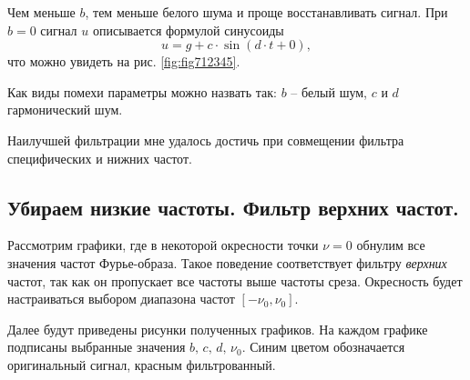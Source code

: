 \documentclass[a4paper, 12pt]{article}
\begin{document}
    Чем меньше $b$, тем меньше белого шума и проще восстанавливать сигнал.
    При $b=0$ сигнал $u$ описывается формулой синусоиды $$u=g+c\cdot\sin{(d\cdot t+0)},$$
    что можно увидеть на рис. \ref{fig:fig712345}.


    Как виды помехи параметры можно назвать так: $b$ -- белый шум, $c \text{ и } d$ гармонический шум.

    
    Наилучшей фильтрации мне удалось достичь при совмещении фильтра специфических и нижних частот.
   

    \subsection{Убираем низкие частоты. Фильтр верхних частот.}
    Рассмотрим графики, где в некоторой окресности точки $\nu=0$ обнулим все значения частот Фурье-образа.
    Такое поведение соответствует фильтру \textit{верхних} частот, так как он пропускает все частоты выше частоты среза.
    Окресность будет настраиваться выбором диапазона частот $[-\nu_0,\nu_0]$.


    Далее будут приведены рисунки полученных графиков. На каждом графике подписаны выбранные значения $b,\,c,\,d,\,\nu_0$. 
    Синим цветом обозначается оригинальный сигнал, красным фильтрованный.
\end{document}
